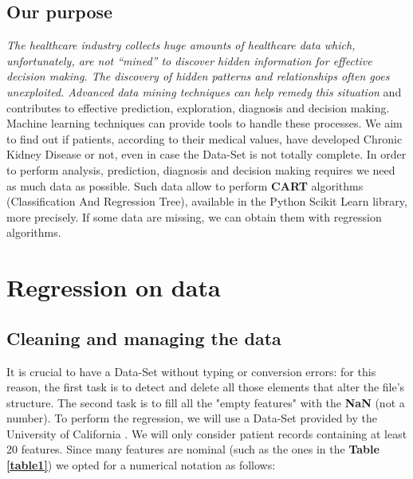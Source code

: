 \documentclass[10pt]{article}
\begin{document}
\subsection{Our purpose}
\textit{The healthcare industry collects huge amounts of healthcare data which, unfortunately, are not “mined” to discover hidden information for effective decision making. The discovery of hidden patterns and relationships often goes unexploited. Advanced data mining techniques can help remedy this situation} \cite{SITE} and contributes to effective prediction, exploration, diagnosis and decision making. Machine learning techniques can provide tools to handle these processes. We aim to find out if patients, according to their medical values, have developed Chronic Kidney Disease or not, even in case the Data-Set is not totally complete. 
In order to perform analysis, prediction, diagnosis and decision making requires we need as much data as possible. Such data allow to perform \textbf{CART} algorithms (Classification And Regression Tree), available in the Python Scikit Learn library, more precisely. If some data are missing, we can obtain them with regression algorithms.

\pagebreak

\section{Regression on data}
\subsection{Cleaning and managing the data}
 It is crucial to have a Data-Set without typing or conversion errors: for this reason, the first task is to detect and delete all those elements that alter the file's structure. The second task is to fill all the "empty features" with the \textbf{NaN} (not a number).
To perform the regression, we will use a Data-Set provided by the University of California \cite{DS}. We will only consider patient records containing at least 20 features. Since many features are nominal (such as the ones in the \textbf{Table} \textbf{\ref{table1}}) we opted for a numerical notation as follows:

\begin{table}[h]
\caption{Conversion of the descriptions in binary values}
\label{table1}
\end{table}
\end{document}
